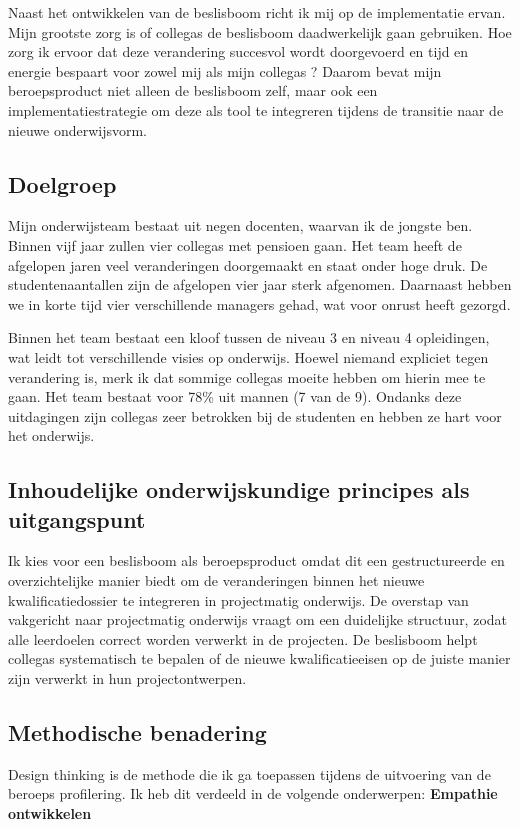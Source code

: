 Naast het ontwikkelen van de beslisboom richt ik mij op de implementatie ervan. Mijn grootste zorg is of collega\textquotesingle s
de beslisboom daadwerkelijk gaan gebruiken. Hoe zorg ik ervoor dat deze verandering succesvol wordt doorgevoerd en tijd en energie bespaart voor zowel mij als mijn collega\textquotesingle s
? Daarom bevat mijn beroepsproduct niet alleen de beslisboom zelf, maar ook een implementatiestrategie om deze als tool te integreren tijdens de transitie naar de nieuwe onderwijsvorm.
\subsection{Doelgroep}
Mijn onderwijsteam bestaat uit negen docenten, waarvan ik de jongste ben. Binnen vijf jaar zullen vier collega\textquotesingle s
 met pensioen gaan. Het team heeft de afgelopen jaren veel veranderingen doorgemaakt en staat onder hoge druk. De studentenaantallen zijn de afgelopen vier jaar sterk afgenomen. Daarnaast hebben we in korte tijd vier verschillende managers gehad, wat voor onrust heeft gezorgd.

Binnen het team bestaat een kloof tussen de niveau 3 en niveau 4 opleidingen, wat leidt tot verschillende visies op onderwijs. Hoewel niemand expliciet tegen verandering is, merk ik dat sommige collega\textquotesingle s
 moeite hebben om hierin mee te gaan. Het team bestaat voor 78\% uit mannen (7 van de 9). Ondanks deze uitdagingen zijn collega\textquotesingle s
 zeer betrokken bij de studenten en hebben ze hart voor het onderwijs.
\subsection{Inhoudelijke onderwijskundige principes als uitgangspunt}
Ik kies voor een beslisboom als beroepsproduct omdat dit een gestructureerde en overzichtelijke manier biedt om de veranderingen binnen het nieuwe kwalificatiedossier te integreren in projectmatig onderwijs. De overstap van vakgericht naar projectmatig onderwijs vraagt om een duidelijke structuur, zodat alle leerdoelen correct worden verwerkt in de projecten. De beslisboom helpt collega\textquotesingle s
 systematisch te bepalen of de nieuwe kwalificatieeisen op de juiste manier zijn verwerkt in hun projectontwerpen.
\subsection{Methodische benadering}
Design thinking is de methode die ik ga toepassen tijdens de uitvoering van de beroeps profilering. Ik heb dit verdeeld in de volgende onderwerpen:
\textbf{Empathie ontwikkelen}

